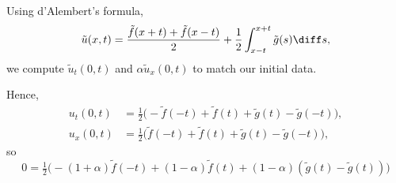 \begin{solution}
  Using d'Alembert's formula,
  \[
    \tilde u(x,t) =\frac{\tilde f(x+t)+\tilde
      f(x-t)}{2}+\frac{1}{2}\int_{x-t}^{x+t}\tilde g(s)\diff s,
  \]
  we compute \(\tilde u_t(0,t)\) and \(\alpha\tilde u_x(0,t)\) to match
  our initial data.

  Hence,
  \begin{align*}
    u_t(0,t)&=\tfrac{1}{2}
              \bigl(-\tilde f(-t)+\tilde f(t)+\tilde g(t)-\tilde g(-t)\bigr),\\
    u_x(0,t)&=\tfrac{1}{2}
              \bigl(\tilde f(-t)+\tilde f(t)+\tilde g(t)-\tilde g(-t)\bigr),
  \end{align*}
  so
  \[
    0=\tfrac{1}{2}\bigl(-(1+\alpha)\tilde f(-t)+(1-\alpha)\tilde
    f(t)+(1-\alpha)(\tilde g(t)-\tilde g(t))\bigr)
  \]
\end{solution}
\newpage

